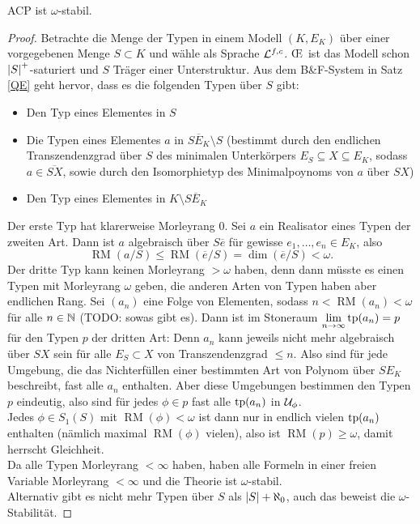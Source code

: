     \begin{theorem}
    	ACP ist $\omega$-stabil.
    \end{theorem}
    \begin{proof}
    	Betrachte die Menge der Typen in einem Modell $(K,E_K)$ über einer vorgegebenen Menge $S\subset K$ und wähle als Sprache $\mathcal{L}^{f,c}$. \OE\ ist das Modell schon ${\left| S \right|}^+$-saturiert und $S$ Träger einer Unterstruktur. Aus dem B\&F-System in Satz \ref{QE} geht hervor, dass es die folgenden Typen über $S$ gibt:
    	\begin{itemize}
    		\item Den Typ eines Elementes in $S$
    		\item Die Typen eines Elementes $a$ in $\overline{SE_K}\setminus S$ (bestimmt durch den endlichen Transzendenzgrad über $S$ des minimalen Unterkörpers $E_S\subseteq X\subseteq E_K$, sodass $a\in\overline{SX}$, sowie durch den Isomorphietyp des Minimalpoynoms von $a$ über $SX$)
    		\item Den Typ eines Elementes in $K\setminus\overline{SE_K}$
    	\end{itemize}
        Der erste Typ hat klarerweise Morleyrang 0. Sei $a$ ein Realisator eines Typen der zweiten Art. Dann ist $a$ algebraisch über $S\overline{e}$ für gewisse $e_1,\dots,e_n\in E_K$, also $$\operatorname{RM}(a/S)\leq\operatorname{RM}(\overline{e}/S)=\dim(\overline{e}/S)<\omega.$$
        Der dritte Typ kann keinen Morleyrang $>\omega$ haben, denn dann müsste es einen Typen mit Morleyrang $\omega$ geben, die anderen Arten von Typen haben aber endlichen Rang. Sei $(a_n)$ eine Folge von Elementen, sodass $n<\operatorname{RM}(a_n)<\omega$ für alle $n\in\mathbb{N}$ (TODO: sowas gibt es). Dann ist im Stoneraum $\lim\limits_{n\rightarrow\infty}\operatorname{tp}(a_n)=p$ für den Typen $p$ der dritten Art: Denn $a_n$ kann jeweils nicht mehr algebraisch über $SX$ sein für alle $E_S\subset X$ von Transzendenzgrad $\leq n$. Also sind für jede Umgebung, die das Nichterfüllen einer bestimmten Art von Polynom über $SE_K$ beschreibt, fast alle $a_n$ enthalten. Aber diese Umgebungen bestimmen den Typen $p$ eindeutig, also sind für jedes $\phi\in p$ fast alle $\operatorname{tp}(a_n)$ in $\mathcal{U}_\phi$.\\
        Jedes $\phi\in S_1(S)$ mit $\operatorname{RM}(\phi)<\omega$ ist dann nur in endlich vielen $\operatorname{tp}(a_n)$ enthalten (nämlich maximal $\operatorname{RM}(\phi)$ vielen), also ist $\operatorname{RM}(p)\geq\omega$, damit herrscht Gleichheit.\\
        Da alle Typen Morleyrang $<\infty$ haben, haben alle Formeln in einer freien Variable Morleyrang $<\infty$ und die Theorie ist $\omega$-stabil.\\
        Alternativ gibt es nicht mehr Typen über $S$ als ${\left| S \right|}+\aleph_0$, auch das beweist die $\omega$-Stabilität.
    \end{proof}